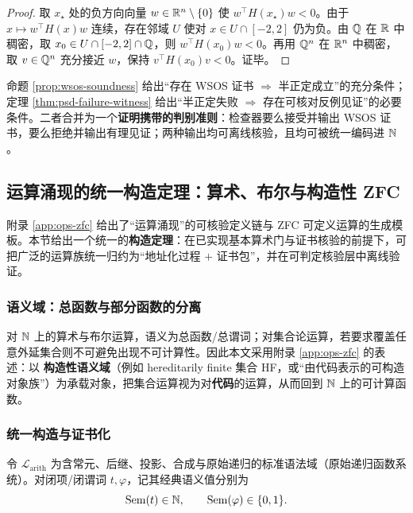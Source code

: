 \begin{proof}
取 $x_\star$ 处的负方向向量 $w\in\mathbb{R}^n\setminus\{0\}$ 使 $w^\top H(x_\star)w<0$。由于 $x\mapsto w^\top H(x)w$ 连续，存在邻域 $U$ 使对 $x\in U\cap[-2,2]$ 仍为负。由 $\mathbb{Q}$ 在 $\mathbb{R}$ 中稠密，取 $x_0\in U\cap[-2,2]\cap\mathbb{Q}$，则 $w^\top H(x_0)w<0$。再用 $\mathbb{Q}^n$ 在 $\mathbb{R}^n$ 中稠密，取 $v\in\mathbb{Q}^n$ 充分接近 $w$，保持 $v^\top H(x_0)v<0$。证毕。
\end{proof}

\begin{remark}
命题 \ref{prop:wsos-soundness} 给出“存在 WSOS 证书 $\Rightarrow$ 半正定成立”的充分条件；定理 \ref{thm:psd-failure-witness} 给出“半正定失败 $\Rightarrow$ 存在可核对反例见证”的必要条件。二者合并为一个\textbf{证明携带的判别准则}：检查器要么接受并输出 WSOS 证书，要么拒绝并输出有理见证；两种输出均可离线核验，且均可被统一编码进 $\mathbb{N}$。
\end{remark}

\subsection{运算涌现的统一构造定理：算术、布尔与构造性 ZFC}\label{app:unified-compiler}

附录 \ref{app:ops-zfc} 给出了“运算涌现”的可核验定义链与 ZFC 可定义运算的生成模板。本节给出一个统一的\textbf{构造定理}：在已实现基本算术门与证书核验的前提下，可把广泛的运算族统一归约为“地址化过程 $+$ 证书包”，并在可判定核验层中离线验证。

\subsubsection{语义域：总函数与部分函数的分离}

对 $\mathbb{N}$ 上的算术与布尔运算，语义为总函数/总谓词；对集合论运算，若要求覆盖任意外延集合则不可避免出现不可计算性。因此本文采用附录 \ref{app:ops-zfc} 的表述：以 \textbf{构造性语义域}（例如 hereditarily finite 集合 HF，或“由代码表示的可构造对象族”）为承载对象，把集合运算视为对\textbf{代码}的运算，从而回到 $\mathbb{N}$ 上的可计算函数。

\subsubsection{统一构造与证书化}

令 $\mathcal{L}_{\mathrm{arith}}$ 为含常元、后继、投影、合成与原始递归的标准语法域（原始递归函数系统）。对闭项/闭谓词 $t,\varphi$，记其经典语义值分别为
$$
\mathrm{Sem}(t)\in\mathbb{N},\qquad \mathrm{Sem}(\varphi)\in\{0,1\}.
$$

